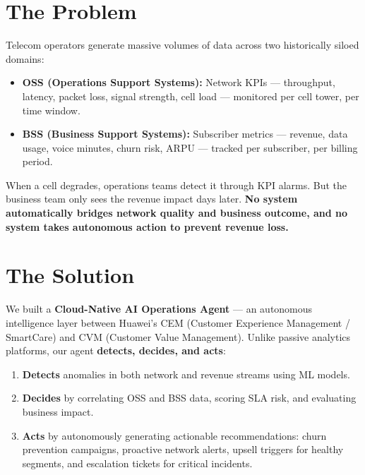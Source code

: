 \documentclass[12pt,a4paper]{report}
\begin{document}
\section{The Problem}

Telecom operators generate massive volumes of data across two historically siloed domains:

\begin{itemize}[nosep]
  \item \textbf{OSS (Operations Support Systems):} Network KPIs --- throughput, latency, packet loss, signal strength, cell load --- monitored per cell tower, per time window.
  \item \textbf{BSS (Business Support Systems):} Subscriber metrics --- revenue, data usage, voice minutes, churn risk, ARPU --- tracked per subscriber, per billing period.
\end{itemize}

\noindent When a cell degrades, operations teams detect it through KPI alarms. But the business team only sees the revenue impact days later. \textbf{No system automatically bridges network quality and business outcome, and no system takes autonomous action to prevent revenue loss.}

\section{The Solution}

We built a \textbf{Cloud-Native AI Operations Agent} --- an autonomous intelligence layer between Huawei's CEM (Customer Experience Management / SmartCare) and CVM (Customer Value Management). Unlike passive analytics platforms, our agent \textbf{detects, decides, and acts}:

\begin{enumerate}[nosep]
  \item \textbf{Detects} anomalies in both network and revenue streams using ML models.
  \item \textbf{Decides} by correlating OSS and BSS data, scoring SLA risk, and evaluating business impact.
  \item \textbf{Acts} by autonomously generating actionable recommendations: churn prevention campaigns, proactive network alerts, upsell triggers for healthy segments, and escalation tickets for critical incidents.
\end{enumerate}
\end{document}
